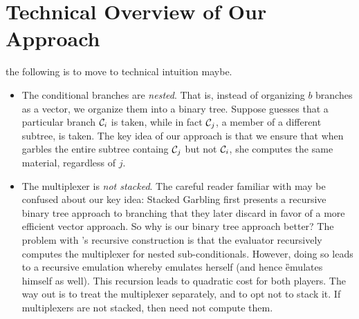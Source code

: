 
\section{Technical Overview of Our Approach}



the following is to move to technical intuition maybe.
\begin{itemize}
	
	\item The conditional branches are \emph{nested}.
	That is, instead of organizing $b$ branches as a vector, we
	organize them into a binary tree.
	Suppose \E guesses that a particular branch $\mathcal C_i$ is taken,
	while in fact $\mathcal C_j$, a member of a different subtree, is taken.
	The key idea of our approach is that we ensure that when \ev
	garbles the entire subtree containg $\mathcal C_j$ but not $\mathcal C_i$, she
	computes the same material, regardless of $j$.
	\item The multiplexer is \emph{not stacked}.
	The careful reader familiar with \cite{EPRINT:HeaKol20b} may be
	confused about our key idea: Stacked Garbling first presents a
	recursive binary tree approach to branching that they later
	discard in favor of a more efficient vector approach.
	So why is our binary tree approach better?
	The problem with \cite{EPRINT:HeaKol20b}'s recursive construction
	is that the evaluator recursively computes the multiplexer for
	nested sub-conditionals.
	However, doing so leads to a recursive emulation whereby \E
	emulates herself (and hence \G emulates himself as well).
	This recursion leads to quadratic cost for both players.
	The way out is to treat the multiplexer separately, and to opt not
	to stack it.
	If multiplexers are not stacked, then \E need not compute them.
\end{itemize}







